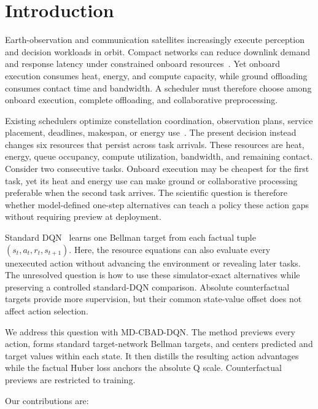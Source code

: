 \documentclass[11pt]{article}
\newcommand{\method}{MD-CBAD-DQN\xspace}
\begin{document}
\section{Introduction}

Earth-observation and communication satellites increasingly execute perception and decision workloads in orbit. Compact networks can reduce downlink demand and response latency under constrained onboard resources~\cite{9925218,10107454,10378728,10440355,10423050}. Yet onboard execution consumes heat, energy, and compute capacity, while ground offloading consumes contact time and bandwidth. A scheduler must therefore choose among onboard execution, complete offloading, and collaborative preprocessing.

Existing schedulers optimize constellation coordination, observation plans, service placement, deadlines, makespan, or energy use~\cite{RN8,RN10,RN20,RN22,RN23,RN27,RN28}. The present decision instead changes six resources that persist across task arrivals. These resources are heat, energy, queue occupancy, compute utilization, bandwidth, and remaining contact. Consider two consecutive tasks. Onboard execution may be cheapest for the first task, yet its heat and energy use can make ground or collaborative processing preferable when the second task arrives. The scientific question is therefore whether model-defined one-step alternatives can teach a policy these action gaps without requiring preview at deployment.

Standard DQN~\cite{mnih2015human,watkins1992q} learns one Bellman target from each factual tuple $(s_t,a_t,r_t,s_{t+1})$. Here, the resource equations can also evaluate every unexecuted action without advancing the environment or revealing later tasks. The unresolved question is how to use these simulator-exact alternatives while preserving a controlled standard-DQN comparison. Absolute counterfactual targets provide more supervision, but their common state-value offset does not affect action selection.

We address this question with \method. The method previews every action, forms standard target-network Bellman targets, and centers predicted and target values within each state. It then distills the resulting action advantages while the factual Huber loss anchors the absolute Q scale. Counterfactual previews are restricted to training.

Our contributions are:
\end{document}
